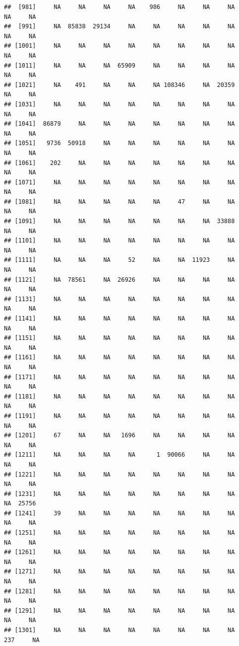 \documentclass[11pt,a4paper,]{article}
\begin{document}
\begin{verbatim}
##  [981]     NA     NA     NA     NA    986     NA     NA     NA     NA     NA
##  [991]     NA  85838  29134     NA     NA     NA     NA     NA     NA     NA
## [1001]     NA     NA     NA     NA     NA     NA     NA     NA     NA     NA
## [1011]     NA     NA     NA  65909     NA     NA     NA     NA     NA     NA
## [1021]     NA    491     NA     NA     NA 108346     NA  20359     NA     NA
## [1031]     NA     NA     NA     NA     NA     NA     NA     NA     NA     NA
## [1041]  86879     NA     NA     NA     NA     NA     NA     NA     NA     NA
## [1051]   9736  50918     NA     NA     NA     NA     NA     NA     NA     NA
## [1061]    202     NA     NA     NA     NA     NA     NA     NA     NA     NA
## [1071]     NA     NA     NA     NA     NA     NA     NA     NA     NA     NA
## [1081]     NA     NA     NA     NA     NA     47     NA     NA     NA     NA
## [1091]     NA     NA     NA     NA     NA     NA     NA  33888     NA     NA
## [1101]     NA     NA     NA     NA     NA     NA     NA     NA     NA     NA
## [1111]     NA     NA     NA     52     NA     NA  11923     NA     NA     NA
## [1121]     NA  78561     NA  26926     NA     NA     NA     NA     NA     NA
## [1131]     NA     NA     NA     NA     NA     NA     NA     NA     NA     NA
## [1141]     NA     NA     NA     NA     NA     NA     NA     NA     NA     NA
## [1151]     NA     NA     NA     NA     NA     NA     NA     NA     NA     NA
## [1161]     NA     NA     NA     NA     NA     NA     NA     NA     NA     NA
## [1171]     NA     NA     NA     NA     NA     NA     NA     NA     NA     NA
## [1181]     NA     NA     NA     NA     NA     NA     NA     NA     NA     NA
## [1191]     NA     NA     NA     NA     NA     NA     NA     NA     NA     NA
## [1201]     67     NA     NA   1696     NA     NA     NA     NA     NA     NA
## [1211]     NA     NA     NA     NA      1  90066     NA     NA     NA     NA
## [1221]     NA     NA     NA     NA     NA     NA     NA     NA     NA     NA
## [1231]     NA     NA     NA     NA     NA     NA     NA     NA     NA  25756
## [1241]     39     NA     NA     NA     NA     NA     NA     NA     NA     NA
## [1251]     NA     NA     NA     NA     NA     NA     NA     NA     NA     NA
## [1261]     NA     NA     NA     NA     NA     NA     NA     NA     NA     NA
## [1271]     NA     NA     NA     NA     NA     NA     NA     NA     NA     NA
## [1281]     NA     NA     NA     NA     NA     NA     NA     NA     NA     NA
## [1291]     NA     NA     NA     NA     NA     NA     NA     NA     NA     NA
## [1301]     NA     NA     NA     NA     NA     NA     NA     NA    237     NA

\end{verbatim}
\end{document}

